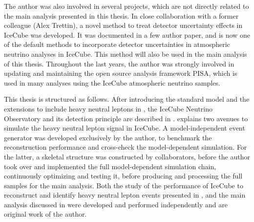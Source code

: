 The author was also involved in several projects, which are not directly related to the main analysis presented in this thesis. In close collaboration with a former colleague (Alex Trettin), a novel method to treat detector uncertainty effects in IceCube was developed. It was documented in a few author paper, and is now one of the default methods to incorporate detector uncertainties in atmospheric neutrino analyses in IceCube. This method will also be used in the main analysis of this thesis. Throughout the last years, the author was strongly involved in updating and maintaining the open source analysis framework PISA, which is used in many analyses using the IceCube atmospheric neutrino samples.

This thesis is structured as follows. After introducing the standard model and the extensions to include heavy neutral leptons in , the IceCube Neutrino Observatory and its detection principle are described in .  explains two avenues to simulate the heavy neutral lepton signal in IceCube. A model-independent event generator was developed exclusively by the author, to benchmark the reconstruction performance and cross-check the model-dependent simulation. For the latter, a skeletal structure was constructed by collaborators, before the author took over and implemented the full model-dependent simulation chain, continuously optimizing and testing it, before producing and processing the full samples for the main analysis. Both the study of the performance of IceCube to reconstruct and identify heavy neutral lepton events presented in , and the main analysis discussed in  were developed and performed independently and are original work of the author.
